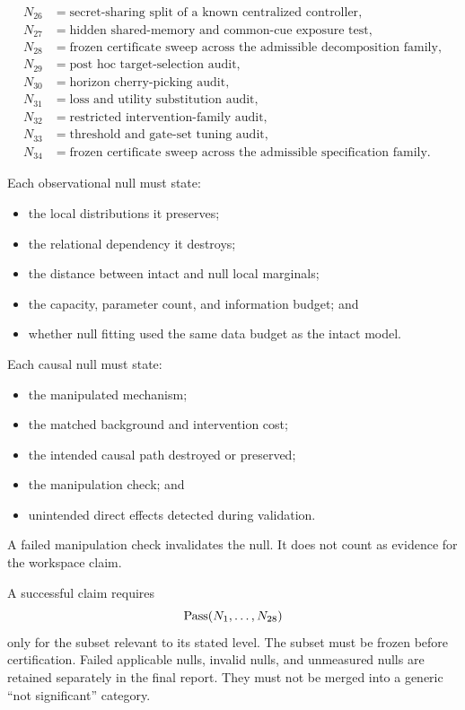 \[\begin{aligned}
N_{26}&=\text{secret-sharing split of a known centralized controller},\\
N_{27}&=\text{hidden shared-memory and common-cue exposure test},\\
N_{28}&=\text{frozen certificate sweep across the admissible decomposition family},\\
N_{29}&=\text{post hoc target-selection audit},\\
N_{30}&=\text{horizon cherry-picking audit},\\
N_{31}&=\text{loss and utility substitution audit},\\
N_{32}&=\text{restricted intervention-family audit},\\
N_{33}&=\text{threshold and gate-set tuning audit},\\
N_{34}&=\text{frozen certificate sweep across the admissible specification family}.
\end{aligned}
\]


Each observational null must state:
\begin{itemize}
\item the local distributions it preserves;
\item the relational dependency it destroys;
\item the distance between intact and null local marginals;
\item the capacity, parameter count, and information budget; and
\item whether null fitting used the same data budget as the intact model.
\end{itemize}
Each causal null must state:
\begin{itemize}
\item the manipulated mechanism;
\item the matched background and intervention cost;
\item the intended causal path destroyed or preserved;
\item the manipulation check; and
\item unintended direct effects detected during validation.
\end{itemize}
A failed manipulation check invalidates the null. It does not count as evidence
for the workspace claim.


A successful claim requires
\[
\operatorname{Pass}(N_1,\ldots,N_{28})
\]
only for the subset relevant to its stated level. The subset must be frozen
before certification. Failed applicable nulls, invalid nulls, and unmeasured
nulls are retained separately in the final report. They must not be merged
into a generic ``not significant'' category.

